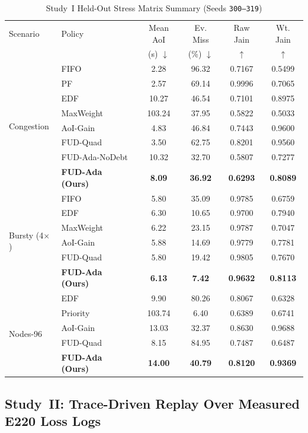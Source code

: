 \documentclass[journal]{IEEEtran}
\begin{document}
\begin{table}[t]
\centering
\caption{Study~I Held-Out Stress Matrix Summary (Seeds \texttt{300--319})}
\label{tab:study1}
\scriptsize
\setlength{\tabcolsep}{2.8pt}
\begin{tabular}{@{}llcccc@{}}
\toprule
Scenario & Policy & Mean AoI & Ev. Miss & Raw Jain & Wt. Jain \\
 & & (s) $\downarrow$ & (\%) $\downarrow$ & $\uparrow$ & $\uparrow$ \\
\midrule
\multirow{8}{*}{Congestion}
 & FIFO & 2.28 & 96.32 & 0.7167 & 0.5499 \\
 & PF & 2.57 & 69.14 & 0.9996 & 0.7065 \\
 & EDF & 10.27 & 46.54 & 0.7101 & 0.8975 \\
 & MaxWeight & 103.24 & 37.95 & 0.5822 & 0.5033 \\
 & AoI-Gain & 4.83 & 46.84 & 0.7443 & 0.9600 \\
 & FUD-Quad & 3.50 & 62.75 & 0.8201 & 0.9560 \\
 & FUD-Ada-NoDebt & 10.32 & 32.70 & 0.5807 & 0.7277 \\
 & \textbf{FUD-Ada (Ours)} & \textbf{8.09} & \textbf{36.92} & \textbf{0.6293} & \textbf{0.8089} \\
\midrule
\multirow{6}{*}{Bursty (4$\times$)}
 & FIFO & 5.80 & 35.09 & 0.9785 & 0.6759 \\
 & EDF & 6.30 & 10.65 & 0.9700 & 0.7940 \\
 & MaxWeight & 6.22 & 23.15 & 0.9787 & 0.7047 \\
 & AoI-Gain & 5.88 & 14.69 & 0.9779 & 0.7781 \\
 & FUD-Quad & 5.80 & 19.42 & 0.9805 & 0.7670 \\
 & \textbf{FUD-Ada (Ours)} & \textbf{6.13} & \textbf{7.42} & \textbf{0.9632} & \textbf{0.8113} \\
\midrule
\multirow{5}{*}{Nodes-96}
 & EDF & 9.90 & 80.26 & 0.8067 & 0.6328 \\
 & Priority & 103.74 & 6.40 & 0.6389 & 0.6741 \\
 & AoI-Gain & 13.03 & 32.37 & 0.8630 & 0.9688 \\
 & FUD-Quad & 8.15 & 84.95 & 0.7487 & 0.6487 \\
 & \textbf{FUD-Ada (Ours)} & \textbf{14.00} & \textbf{40.79} & \textbf{0.8120} & \textbf{0.9369} \\
\bottomrule
\end{tabular}
\end{table}

\subsection{Study~II: Trace-Driven Replay Over Measured E220 Loss Logs}
\end{document}
